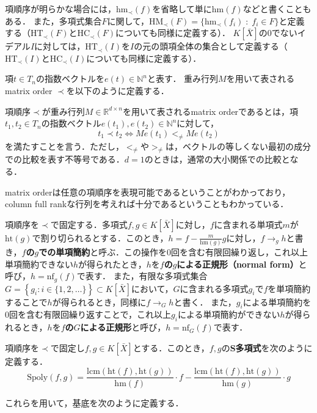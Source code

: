 項順序が明らかな場合には，$\mathrm{hm}_{\prec}(f)$を省略して単に$\mathrm{hm}(f)$などと書くこともある．
また，多項式集合$F$に関して，$\mathrm{HM}_{\prec}(F) = \{ \mathrm{hm}_{\prec}(f_i) \;:\; f_i \in F \}$と定義する（$\mathrm{HT}_{\prec}(F)\text{と}\mathrm{HC}_{\prec}(F)$についても同様に定義する）．
$K[\bar{X}]$の$0$でないイデアル$I$に対しては，$\mathrm{HT}_\prec(I)$を$I$の元の頭項全体の集合として定義する（$\mathrm{HT}_{\prec}(I)\text{と}\mathrm{HC}_{\prec}(I)$についても同様に定義する）．
\par
項$t \in T_n$の指数ベクトルを$e(t) \in \mathbb{N}^{n}$と表す．
重み行列$M$を用いて表されるmatrix order $\prec$を以下のように定義する．
\begin{definition}
	項順序$\prec$が重み行列$M \in \mathbb{R}^{d\times n}$を用いて表されるmatrix orderであるとは，項$t_1, t_2 \in T_n$の指数ベクトル$e(t_1), e(t_2) \in \mathbb{N}^{n}$に対して，
	$$t_1 \prec t_2 \Longleftrightarrow Me(t_1) <_{\ne} Me(t_2)$$
	を満たすことを言う．ただし，$<_{\ne}$や$>_{\ne}$は，ベクトルの等しくない最初の成分での比較を表す不等号である．$d=1$のときは，通常の大小関係での比較となる．
\end{definition}
matrix orderは任意の項順序を表現可能である\cite{MR826583}ということがわかっており，column full rankな行列を考えれば十分であるということもわかっている．
\par
項順序を$\prec$で固定する．多項式$f, g \in K[\bar{X}]$に対し，$f$に含まれる単項式$m$が$\mathrm{ht}(g)$で割り切られるとする．このとき，$h = f - \frac{m}{\mathrm{hm}(g)}g$に対し，$f \to_g h$と書き，\textbf{$f$の$g$での単項簡約}と呼ぶ．この操作を$0$回を含む有限回繰り返し，これ以上単項簡約できない$h$が得られたとき，$h$を\textbf{$f$の$g$による正規形（normal form）}と呼び，$h = \mathrm{nf}_g(f)$で表す．
また，有限な多項式集合$G=\left\{g_i :i \in \{1,2, \dots\}\right\} \subset K[\bar{X}]$において，$G$に含まれる多項式$g_i$で$f$を単項簡約することで$h$が得られるとき，同様に$f \to_G h$と書く．
また，$g_i$による単項簡約を$0$回を含む有限回繰り返すことで，これ以上$g_i$による単項簡約ができない$h$が得られるとき，$h$を\textbf{$f$の$G$による正規形}と呼び，$h = \mathrm{nf}_G(f)$で表す．
\begin{definition}[S多項式]
	項順序を$\prec$で固定し$f, g \in K[\bar{X}]$とする．このとき，$f, g$の\textbf{S多項式}を次のように定義する．
	$$\mathrm{Spoly}(f, g)=\frac{\mathrm{lcm}(\mathrm{ht}(f), \mathrm{ht}(g))}{\mathrm{hm}(f)}\cdot f - \frac{\mathrm{lcm}(\mathrm{ht}(f), \mathrm{ht}(g))}{\mathrm{hm}(g)}\cdot g$$
\end{definition}
これらを用いて，\groebner{}基底を次のように定義する．
